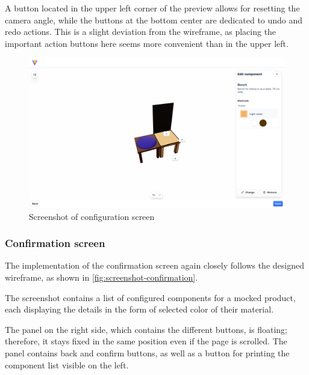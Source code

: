 A button located in the upper left corner of the preview allows for resetting the camera angle, while the buttons at the bottom center are dedicated to undo and redo actions. This is a slight deviation from the wireframe, as placing the important action buttons here seems more convenient than in the upper left.

\begin{figure}[h]
\centering
\includegraphics[width=\textwidth]{images/screenshot_configurator.png}
\caption{Screenshot of configuration screen}
\label{fig:screenshot-configuration}
\end{figure}

\subsubsection{Confirmation screen}

The implementation of the confirmation screen again closely follows the designed wireframe, as shown in \autoref{fig:screenshot-confirmation}.

The screenshot contains a list of configured components for a mocked product, each displaying the details in the form of selected color of their material.

The panel on the right side, which contains the different buttons, is floating; therefore, it stays fixed in the same position even if the page is scrolled. The panel contains back and confirm buttons, as well as a button for printing the component list visible on the left.

